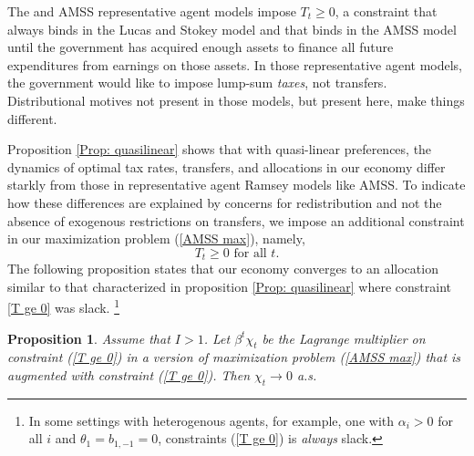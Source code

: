 \documentclass[thmsb,11pt]{article}
\newtheorem{proposition}{Proposition}
\begin{document}
The \cite{LucasJr.1983} and AMSS representative agent models
impose $T_{t}\geq 0$, a constraint that always binds in the Lucas and Stokey
model and that binds in the AMSS model  until the government has acquired enough
assets to finance all future expenditures from earnings on those assets. In those
representative agent models, the government would like to impose lump-sum \emph{taxes}, not
transfers. Distributional motives not present in those models, but present here, make things  different.
\smallskip

\smallskip Proposition \ref{Prop: quasilinear} shows that with quasi-linear preferences,  the dynamics of optimal
 tax rates, transfers,  and allocations in our economy differ starkly
 from those in representative agent Ramsey models like AMSS. To indicate how these differences are explained by concerns for redistribution and not the absence of exogenous restrictions on transfers, we impose an additional constraint in our maximization problem (\ref{AMSS max}), namely,
\begin{equation}
T_{t}\geq 0\text{ for all }t.  \label{T ge 0}
\end{equation}%
The following proposition states that our economy converges to an allocation similar to that characterized  in proposition \ref{Prop: quasilinear} where constraint \eqref{T ge 0} was slack. \footnote{In some settings with heterogenous
agents, for example, one with $\alpha_i >0$ for all $i$ and $\theta_1 = b_{1,-1} =0$, constraints (\ref{T ge 0}) is \emph{always} slack.}
\smallskip

\begin{proposition}\label{prop:AMSS_killer1}
Assume that $I > 1$.
Let $\beta ^{t}\chi _{t}$ be the Lagrange multiplier on constraint (\ref{T
ge 0}) in a version of  maximization problem (\ref{AMSS max}) that is augmented with constraint (\ref{T
ge 0}). Then $\chi _{t}\rightarrow
0 $ a.s.
\end{proposition}
\end{document}
